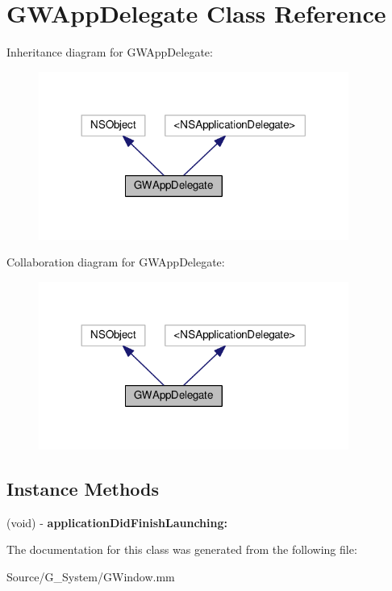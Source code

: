 \hypertarget{interfaceGWAppDelegate}{}\section{G\+W\+App\+Delegate Class Reference}
\label{interfaceGWAppDelegate}


Inheritance diagram for G\+W\+App\+Delegate\+:
\nopagebreak
\begin{figure}[H]
\begin{center}
\leavevmode
\includegraphics[width=288pt]{interfaceGWAppDelegate__inherit__graph}
\end{center}
\end{figure}


Collaboration diagram for G\+W\+App\+Delegate\+:
\nopagebreak
\begin{figure}[H]
\begin{center}
\leavevmode
\includegraphics[width=288pt]{interfaceGWAppDelegate__coll__graph}
\end{center}
\end{figure}
\subsection*{Instance Methods}
\begin{DoxyCompactItemize}
\item 
(void) -\/ {\bfseries application\+Did\+Finish\+Launching\+:}\hypertarget{interfaceGWAppDelegate_a7d719bcad8b9e126701331457d9f9456}{}\label{interfaceGWAppDelegate_a7d719bcad8b9e126701331457d9f9456}

\end{DoxyCompactItemize}


The documentation for this class was generated from the following file\+:\begin{DoxyCompactItemize}
\item 
Source/\+G\+\_\+\+System/G\+Window.\+mm\end{DoxyCompactItemize}
